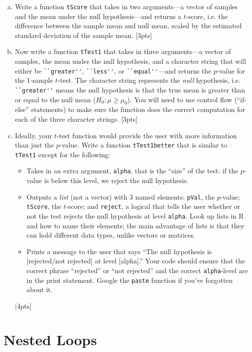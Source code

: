 \documentclass[12pt]{article}
\begin{document}
\begin{enumerate}[(a)]
	\item Write a function \verb|tScore| that takes in two arguments---a vector of samples and the mean under the null hypothesis---and returns a $t$-score, i.e. the difference between the sample mean and null mean, scaled by the estimated standard deviation of the sample mean. [3pts]
	\item Now write a function \verb|tTest1| that takes in three arguments---a vector of samples, the mean under the null hypothesis, and a character string that will either be \verb|``greater''|, \verb|``less''|, or \verb|``equal''|---and returns the $p$-value for the 1-sample $t$-test. The character string represents the \textit{null} hypothesis, i.e. \verb|``greater''| means the null hypothesis is that the true mean is greater than or equal to the null mean ($H_0: \mu \ge \mu_0$). You will need to use control flow (``if-else'' statements) to make sure the function does the correct computation for each of the three character strings. [3pts]
	\item Ideally, your $t$-test function would provide the user with more information than just the $p$-value. Write a function \verb|tTest1better| that is similar to \verb|tTest1| except for the following:
	\begin{itemize}
		\item Takes in an extra argument, \verb|alpha|, that is the ``size'' of the test: if the $p$-value is below this level, we reject the null hypothesis.
		\item Outputs a \textit{list} (not a vector) with 3 named elements: \verb|pVal|, the $p$-value; \verb|tScore|, the $t$-score; and \verb|reject|, a logical that tells the user whether or not the test rejects the null hypothesis at level \verb|alpha|. Look up lists in R and how to name their elements; the main advantage of lists is that they can hold different data types, unlike vectors or matrices.
		\item Prints a message to the user that says ``The null hypothesis is [rejected/not rejected] at level [alpha].'' Your code should ensure that the correct phrase ``rejected'' or ``not rejected'' and the correct \verb|alpha|-level are in the print statement. Google the \verb|paste| function if you've forgotten about it.
	\end{itemize}
	[4pts]
\end{enumerate}

\section{Nested Loops}
\end{document}
